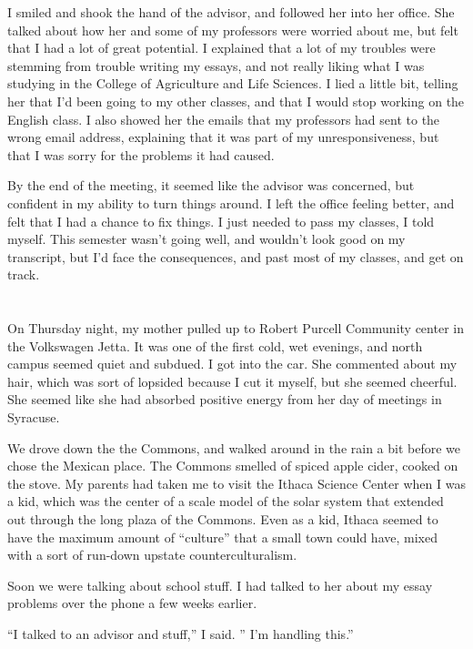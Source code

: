 I smiled and shook the hand of the advisor, and followed her into her office.
She talked about how her and some of my professors were worried about me, but
felt that I had a lot of great potential.  I explained that a lot of my troubles
were stemming from trouble writing my essays, and not really liking what I was
studying in the College of Agriculture and Life Sciences.  I lied a little bit,
telling her that I'd been going to my other classes, and that I would stop
working on the English class.  I also showed her the emails that my professors
had sent to the wrong email address, explaining that it was part of my
unresponsiveness, but that I was sorry for the problems it had caused.

By the end of the meeting, it seemed like the advisor was concerned, but
confident in my ability to turn things around.  I left the office feeling
better, and felt that I had a chance to fix things.  I just needed to pass my
classes, I told myself.  This semester wasn't going well, and wouldn't look good
on my transcript, but I'd face the consequences, and past most of my classes,
and get on track.

\section{}

On Thursday night, my mother pulled up to Robert Purcell Community center in the
Volkswagen Jetta.  It was one of the first cold, wet evenings, and north campus
seemed quiet and subdued.  I got into the car.  She commented about my hair,
which was sort of lopsided because I cut it myself, but she seemed cheerful.
She seemed like she had absorbed positive energy from her day of meetings in
Syracuse.  

We drove down the the Commons, and walked around in the rain a bit before we
chose the Mexican place.  The Commons smelled of spiced apple cider, cooked on
the stove.  My parents had taken me to visit the Ithaca Science Center when I
was a kid, which was the center of a scale model of the solar system that
extended out through the long plaza of the Commons.  Even as a kid, Ithaca
seemed to have the maximum amount of ``culture'' that a small town could have,
mixed with a sort of run-down upstate counterculturalism.

Soon we were talking about school stuff.  I had talked to her about my essay
problems over the phone a few weeks earlier. 

``I talked to an advisor and stuff,'' I said.   '' I'm handling this.''

